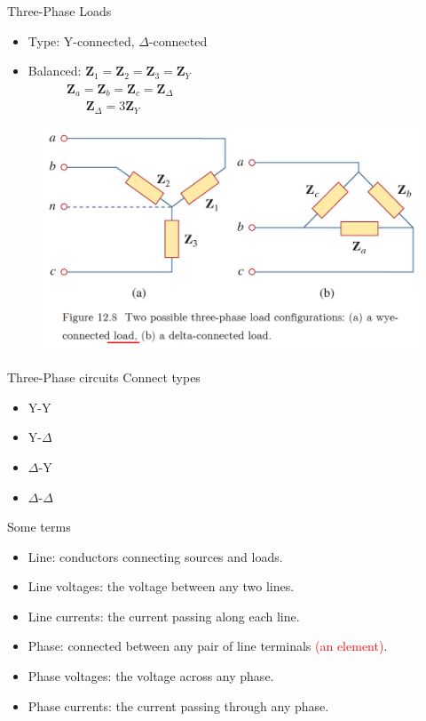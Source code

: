 \documentclass{beamer}
\begin{document}
\begin{frame}{Three-Phase Loads}
    \begin{itemize}
        \item Type: Y-connected, $\Delta$-connected
        \item Balanced: $\textbf{Z}_1=\textbf{Z}_2=\textbf{Z}_3=\textbf{Z}_Y$ \\
        $\ \ \ \ \ \ \ \ \ \ \ \ \ \ \textbf{Z}_a=\textbf{Z}_b=\textbf{Z}_c=\textbf{Z}_{\Delta}$\\
        $\ \ \ \ \ \ \ \ \ \ \ \ \ \ \ \ \ \ \ \ \ \textbf{Z}_{\Delta}=3\textbf{Z}_Y$
    \end{itemize}
    \begin{figure}[H]
        \centering
        \includegraphics[scale = 0.4]{C12/4.png}
        \label{fig:enter-label}
    \end{figure}
\end{frame}

\begin{frame}{Three-Phase circuits}
    Connect types
    \begin{itemize}
        \item Y-Y
        \item Y-$\Delta$
        \item $\Delta$-Y
        \item $\Delta$-$\Delta$
    \end{itemize}
    Some terms
    \begin{itemize}
        \item Line: conductors connecting sources and loads.
        \item Line voltages: the voltage between any two lines.
        \item Line currents: the current passing along each line.
        \item Phase: connected between any pair of line terminals \textcolor{red}{(an element)}.
        \item Phase voltages: the voltage across any phase.
        \item Phase currents: the current passing through any phase.
    \end{itemize}
\end{frame}
\end{document}
